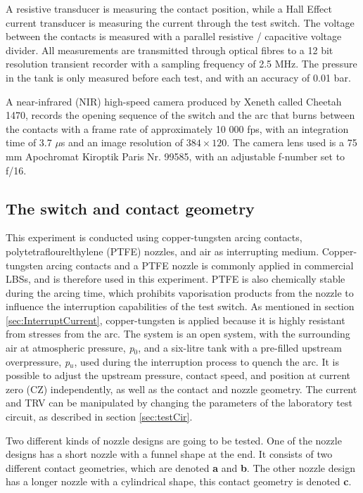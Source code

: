 \documentclass[10pt,b5paper,twoside]{article}
\begin{document}
A resistive transducer is measuring the contact position, while a Hall Effect current transducer is measuring the current through the test switch. The voltage between the contacts is measured with a parallel resistive / capacitive voltage divider. All measurements are transmitted through optical fibres to a 12 bit resolution transient recorder with a sampling frequency of 2.5 MHz. The pressure in the tank is only measured before each test, and with an accuracy of 0.01 bar. 

A near-infrared (NIR) high-speed camera produced by Xeneth called Cheetah 1470, records the opening sequence of the switch and the arc that burns between the contacts with a frame rate of approximately 10 000 fps, with an integration time of 3.7 $\mu$s and an image resolution of $384 \times 120$. The camera lens used is a 75 mm Apochromat Kiroptik Paris Nr. 99585, with an adjustable f-number set to f/16. %

\subsection{The switch and contact geometry} \label{sec:testSwitchandContact}
This experiment is conducted using copper-tungsten arcing contacts, polytetraflourelthylene (PTFE) nozzles, and air as interrupting medium. Copper-tungsten arcing contacts and a PTFE nozzle is commonly applied in commercial LBSs, and is therefore used in this experiment. PTFE is also chemically stable during the arcing time, which prohibits vaporisation products from the nozzle to influence the interruption capabilities of the test switch. As mentioned in section \ref{sec:InterruptCurrent}, copper-tungsten is applied because it is highly resistant from stresses from the arc. The system is an open system, with the surrounding air at atmospheric pressure, \textit{p$_0$}, and a six-litre tank with a pre-filled upstream overpressure, \textit{p$_u$}, used during the interruption process to quench the arc. It is possible to adjust the upstream pressure, contact speed, and position at current zero (CZ) independently, as well as the contact and nozzle geometry. The current and TRV can be manipulated by changing the parameters of the laboratory test circuit, as described in section \ref{sec:testCir}.

Two different kinds of nozzle designs are going to be tested. One of the nozzle designs has a short nozzle with a funnel shape at the end. It consists of two different contact geometries, which are denoted \textbf{a} and \textbf{b}. The other nozzle design has a longer nozzle with a cylindrical shape, this contact geometry is denoted \textbf{c}. 
\end{document}
